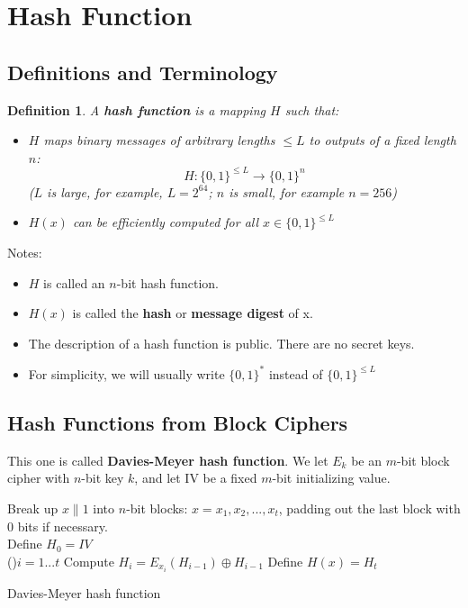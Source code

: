 \documentclass[12pt,titlepage]{article}
\newtheorem{protodefinition}[prototheorem]{Definition}
\newenvironment{definition}
{\colorlet{shadecolor}{cyan!15}\begin{shaded}\begin{protodefinition}\normalfont}{\end{protodefinition}\end{shaded}}
\let\stdsection\section
\renewcommand\section{\clearpage\stdsection}
\begin{document}
\section{Hash Function}
\subsection{Definitions and Terminology}
\begin{definition}
	A \textbf{hash function} is a mapping $H$ such that:\begin{itemize}
	\item $H$ maps binary messages of arbitrary lengths $\leq L$ to outputs of a fixed length $n$:$$H: \{0, 1\}^{\leq L} \rightarrow \{0, 1\}^n$$
	($L$ is large, for example, $L = 2^{64}$; $n$ is small, for example $n = 256$)
	\item $H(x)$ can be efficiently computed for all $x \in \{0, 1\}^{\leq L}$
	\end{itemize}
\end{definition}
Notes: \begin{itemize}
\item $H$ is called an $n$-bit hash function.
\item $H(x)$ is called the \textbf{hash} or \textbf{message digest} of x.
\item The description of a hash function is public. There are no secret keys.
\item For simplicity, we will usually write $\{0, 1\}^*$ instead of $\{0, 1\}^{\leq L}$
\end{itemize}

\subsection{Hash Functions from Block Ciphers}
This one is called \textbf{Davies-Meyer hash function}. We let $E_k$ be an $m$-bit block cipher with $n$-bit key $k$, and let IV be a fixed $m$-bit initializing value.

\begin{algorithm}
	Break up $x\|1$ into $n$-bit blocks: $x = x_1, x_2 ,..., x_t$, padding out the last block with 0 bits if necessary.\\
	Define $H_0 = IV$\\
	\For(){$i = 1...t$}{
		Compute $H_i = E_{x_i} (H_{i-1}) \oplus H_{i-1}$
	}
	Define $H(x) = H_t$
	\caption{Davies-Meyer hash function}
\end{algorithm}
\end{document}
